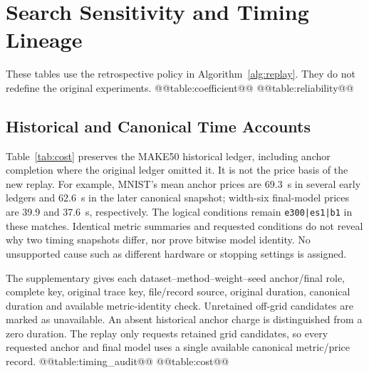 \section{Search Sensitivity and Timing Lineage}\label{app:search}
These tables use the retrospective policy in Algorithm~\ref{alg:replay}.
They do not redefine the original experiments.
@@table:coefficient@@
@@table:reliability@@

\subsection{Historical and Canonical Time Accounts}\label{app:timing}
Table~\ref{tab:cost} preserves the MAKE50 historical ledger, including
anchor completion where the original ledger omitted it. It is not the
price basis of the new replay. For example, MNIST's mean anchor prices
are 69.3~s in several early ledgers and 62.6~s in the later canonical
snapshot; width-six final-model prices are 39.9 and 37.6~s, respectively.
The logical conditions remain \texttt{e300|es1|b1} in these matches.
Identical metric summaries and requested conditions do not reveal why
two timing snapshots differ, nor prove bitwise model identity.
No unsupported cause such as different hardware or stopping settings
is assigned.

The supplementary  gives each
dataset--method--weight--seed anchor/final role, complete key, original
trace key, file/record source, original duration, canonical duration and
available metric-identity check. Unretained off-grid candidates are
marked as unavailable. An absent historical anchor charge is distinguished
from a zero duration. The replay only requests retained grid candidates,
so every requested anchor and final model uses a single available
canonical metric/price record.
@@table:timing_audit@@
@@table:cost@@

